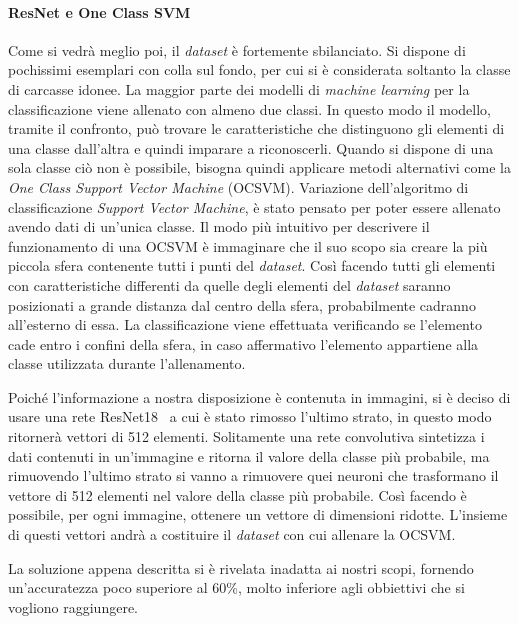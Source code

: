 \paragraph{ResNet e One Class SVM} %
Come si vedrà meglio poi, il \textit{dataset} è fortemente sbilanciato.
Si dispone di pochissimi esemplari con colla sul fondo, per cui si è considerata soltanto la classe di carcasse idonee.
La maggior parte dei modelli di \textit{machine learning} per la classificazione viene allenato con almeno due classi.
In questo modo il modello, tramite il confronto, può trovare le caratteristiche che distinguono gli elementi di una classe dall'altra e quindi imparare a riconoscerli.
Quando si dispone di una sola classe ciò non è possibile, bisogna quindi applicare metodi alternativi come la \textit{One Class Support Vector Machine} (OCSVM).
Variazione dell'algoritmo di classificazione \textit{Support Vector Machine}, è stato pensato per poter essere allenato avendo dati di un'unica classe.
Il modo più intuitivo per descrivere il funzionamento di una OCSVM è immaginare che il suo scopo sia creare la più piccola sfera contenente tutti i punti del \textit{dataset}.
Così facendo tutti gli elementi con caratteristiche differenti da quelle degli elementi del \textit{dataset} saranno posizionati a grande distanza dal centro della sfera, probabilmente cadranno all'esterno di essa.
La classificazione viene effettuata verificando se l'elemento cade entro i confini della sfera, in caso affermativo l'elemento appartiene alla classe utilizzata durante l'allenamento.

Poiché l'informazione a nostra disposizione è contenuta in immagini, si è deciso di usare una rete ResNet18~\cite{resnet} a cui è stato rimosso l'ultimo strato, in questo modo ritornerà vettori di 512 elementi.
Solitamente una rete convolutiva sintetizza i dati contenuti in un'immagine e ritorna il valore della classe più probabile, ma rimuovendo l'ultimo strato si vanno a rimuovere quei neuroni che trasformano il vettore di 512 elementi nel valore della classe più probabile. %
Così facendo è possibile, per ogni immagine, ottenere un vettore di dimensioni ridotte.
L'insieme di questi vettori andrà a costituire il \textit{dataset} con cui allenare la OCSVM.

La soluzione appena descritta si è rivelata inadatta ai nostri scopi, fornendo un'accuratezza poco superiore al 60\%, molto inferiore agli obbiettivi che si vogliono raggiungere.

